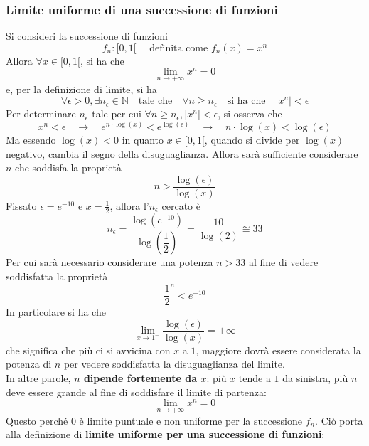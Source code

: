 \documentclass[a4paper]{extarticle}
\begin{document}
\subsubsection{Limite uniforme di una successione di funzioni}
Si consideri la successione di funzioni
\[f_n : [0,1[ \hspace{1em} \text{ definita come } f_n(x) = x^n\]
Allora $\forall x \in [0,1[$, si ha che
\[\lim_{n \to +\infty} x^n = 0\]
e, per la definizione di limite, si ha
\[\forall \epsilon > 0, \exists n_\epsilon \in \mathbb{N} \hspace{1em} \text{tale che} \hspace{1em} \forall n \geq n_\epsilon \hspace{1em} \text{si ha che} \hspace{1em} \vert x^n \vert < \epsilon\]
Per determinare $n_\epsilon$ tale per cui $\forall n \geq n_\epsilon, \vert x^n \vert < \epsilon$, si osserva che
\[x^n < \epsilon \hspace{1em} \rightarrow \hspace{1em} e^{n \cdot \log(x)} < e^{\log(\epsilon)} \hspace{1em} \rightarrow \hspace{1em}n \cdot \log(x) < \log(\epsilon)\]
Ma essendo $\log(x) < 0$ in quanto $x \in [0,1[$, quando si divide per $\log(x)$ negativo, cambia il segno della disuguaglianza. Allora sarà sufficiente considerare $n$ che soddisfa la proprietà
\[n > \frac{\log(\epsilon)}{\log(x)}\]
Fissato $\epsilon=e^{-10}$ e $x=\frac{1}{2}$, allora l'$n_\epsilon$ cercato è
\[n_\epsilon = \frac{\log(e^{-10})}{\log \left(\dfrac{1}{2}\right)}= \frac{10}{\log(2)} \cong 33\]
Per cui sarà necessario considerare una potenza $n>33$ al fine di vedere soddisfatta la proprietà
\[\frac{1}{2}^n < e^{-10}\]
In particolare si ha che
\[\lim_{x \to 1^-} \frac{\log(\epsilon)}{\log(x)} = +\infty\]
che significa che più ci si avvicina con $x$ a $1$, maggiore dovrà essere considerata la potenza di $n$ per vedere soddisfatta la disuguaglianza del limite.\\
In altre parole, \textbf{$n$ dipende fortemente da $x$}: più $x$ tende a $1$ da sinistra, più $n$ deve essere grande al fine di soddisfare il limite di partenza:
\[\lim_{n \to +\infty} x^n = 0\]
Questo perché $0$ è limite puntuale e non uniforme per la successione $f_n$. Ciò porta alla definizione di \textbf{limite uniforme per una successione di funzioni}:
\end{document}
